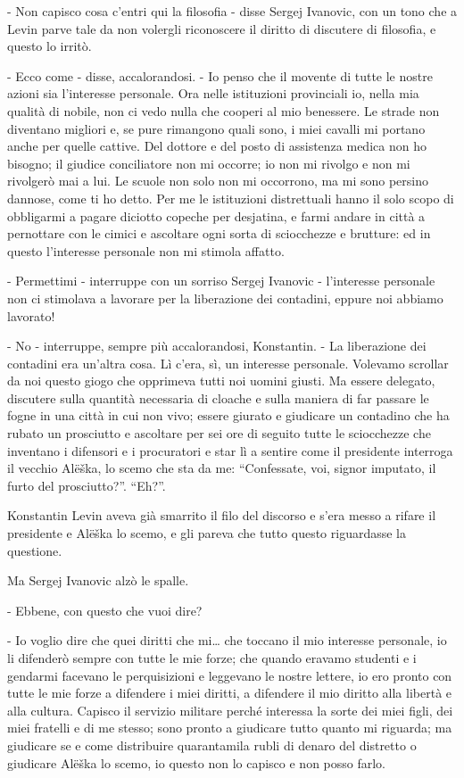 - Non capisco cosa c'entri qui la filosofia - disse Sergej Ivanovic, con un tono che a Levin parve tale da non volergli riconoscere il diritto di discutere di filosofia, e questo lo irritò. 

- Ecco come - disse, accalorandosi. - Io penso che il movente di tutte le nostre azioni sia l'interesse personale. Ora nelle istituzioni provinciali io, nella mia qualità di nobile, non ci vedo nulla che cooperi al mio benessere. Le strade non diventano migliori e, se pure rimangono quali sono, i miei cavalli mi portano anche per quelle cattive. Del dottore e del posto di assistenza medica non ho bisogno; il giudice conciliatore non mi occorre; io non mi rivolgo e non mi rivolgerò mai a lui. Le scuole non solo non mi occorrono, ma mi sono persino dannose, come ti ho detto. Per me le istituzioni distrettuali hanno il solo scopo di obbligarmi a pagare diciotto copeche per desjatina, e farmi andare in città a pernottare con le cimici e ascoltare ogni sorta di sciocchezze e brutture: ed in questo l'interesse personale non mi stimola affatto. 

- Permettimi - interruppe con un sorriso Sergej Ivanovic - l'interesse personale non ci stimolava a lavorare per la liberazione dei contadini, eppure noi abbiamo lavorato! 

- No - interruppe, sempre più accalorandosi, Konstantin. - La liberazione dei contadini era un'altra cosa. Lì c'era, sì, un interesse personale. Volevamo scrollar da noi questo giogo che opprimeva tutti noi uomini giusti. Ma essere delegato, discutere sulla quantità necessaria di cloache e sulla maniera di far passare le fogne in una città in cui non vivo; essere giurato e giudicare un contadino che ha rubato un prosciutto e ascoltare per sei ore di seguito tutte le sciocchezze che inventano i difensori e i procuratori e star lì a sentire come il presidente interroga il vecchio Alëška, lo scemo che sta da me: ``Confessate, voi, signor imputato, il furto del prosciutto?''. ``Eh?''. 

Konstantin Levin aveva già smarrito il filo del discorso e s'era messo a rifare il presidente e Alëška lo scemo, e gli pareva che tutto questo riguardasse la questione. 

Ma Sergej Ivanovic alzò le spalle. 

- Ebbene, con questo che vuoi dire? 

- Io voglio dire che quei diritti che mi\ldots{} che toccano il mio interesse personale, io li difenderò sempre con tutte le mie forze; che quando eravamo studenti e i gendarmi facevano le perquisizioni e leggevano le nostre lettere, io ero pronto con tutte le mie forze a difendere i miei diritti, a difendere il mio diritto alla libertà e alla cultura. Capisco il servizio militare perché interessa la sorte dei miei figli, dei miei fratelli e di me stesso; sono pronto a giudicare tutto quanto mi riguarda; ma giudicare se e come distribuire quarantamila rubli di denaro del distretto o giudicare Alëška lo scemo, io questo non lo capisco e non posso farlo. 

